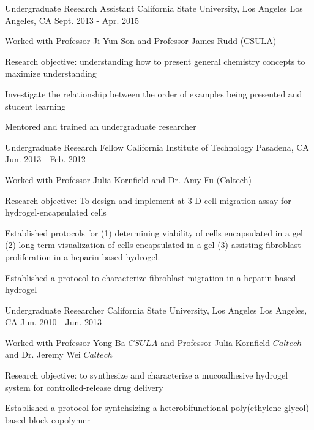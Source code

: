 \begin{cventries}
  \cventry
    {Undergraduate Research Assistant} %
    {California State University, Los Angeles} %
    {Los Angeles, CA} %
    {Sept. 2013 - Apr. 2015} %
    {
      \begin{cvitems} %
        \item {Worked with Professor Ji Yun Son and Professor James Rudd (CSULA)}
        \item {Research objective: understanding how to present general chemistry concepts to maximize understanding}
        \item {Investigate the relationship between the order of examples being presented and student learning}
        \item {Mentored and trained an undergraduate researcher}
      \end{cvitems}
    }

  \cventry
    {Undergraduate Research Fellow} %
    {California Institute of Technology} %
    {Pasadena, CA} %
    {Jun. 2013 - Feb. 2012} %
    {
      \begin{cvitems} %
        \item {Worked with Professor Julia Kornfield and Dr. Amy Fu (Caltech)}
        \item {Research objective: To design and implement at 3-D cell migration assay for hydrogel-encapsulated cells}
        \item {Established protocols for (1) determining viability of cells encapsulated in a gel (2) long-term visualization of cells encapsulated in a gel (3) assisting fibroblast proliferation in a heparin-based hydrogel.}
        \item {Established a protocol to characterize fibroblast migration in a heparin-based hydrogel}
      \end{cvitems}
    }

  \cventry
    {Undergraduate Researcher} %
    {California State University, Los Angeles} %
    {Los Angeles, CA} %
    {Jun. 2010 - Jun. 2013} %
    {
      \begin{cvitems} %
        \item {Worked with Professor Yong Ba \(CSULA\) and Professor Julia Kornfield \(Caltech\) and Dr. Jeremy Wei \(Caltech\)}
        \item {Research objective: to synthesize and characterize a mucoadhesive hydrogel system for controlled-release drug delivery}
        \item {Established a protocol for syntehsizing a heterobifunctional poly(ethylene glycol) based block copolymer}
      \end{cvitems}

    }

\end{cventries}
